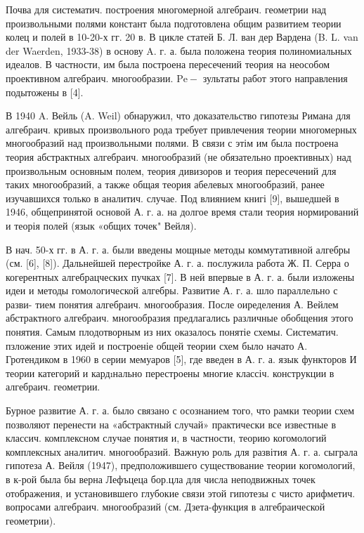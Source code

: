 \documentclass[10pt]{article}
\begin{document}
Почва для систематич. построения многомерной алгебраич. геометрии над произвольными полями констант была подготовлена общим развитием теории колец и полей в 10-20-х гг. 20 в. В цикле статей Б. Л. ван дер Вардена (B. L. van der Waerden, 1933-38) в основу A. г. а. была положена теория полиномиальных идеалов. В частности, им была построена пересечений теория на неособом проективном алгебраич. многообразии. $\mathrm{Pe}-$ зультаты работ этого направления подытожены в [4].



В 1940 A. Вейль (A. Weil) обнаружил, что доказательство гипотезы Римана для алгебраич. кривых произвольного рода требует привлечения теории многомерных многообразий над произвольными полями. В связи с этім им была построена теория абстрактных алгебраич. многообразий (не обязательно проективных) над произвольным основным полем, теория дивизоров и теория пересечений для таких многообразий, а также общая теория абелевых многообразий, ранее изучавшихся только в аналитич. случае. Под влиянием книгі [9], вышедшей в 1946, общепринятой основой А. г. а. на долгое время стали теория нормирований и теорія полей (язык «общих точек" Вейля).



В нач. 50-х гг. в А. г. а. были введены мощные методы коммутативной алгебры (см. [6], [8]). Дальнейшей перестройке А. г. а. послужила работа Ж. П. Серра о когерентных алгебрацческих пучках [7]. В ней впервые в А. г. а. были изложены идеи и методы гомологической алгебры. Развитие А. г. а. шло параллельно с разви- тием понятия алгебраич. многообразия. После оиределения А. Вейлем абстрактного алгебраич. многообразия предлагались различные обобщения этого понятия. Самым плодотворным из них оказалось понятіе схемы. Систематич. пзложение этих идей и построеніе общей теории схем было начато А. Гротендиком в 1960 в серии мемуаров [5], где введен в А. г. а. язык функторов И теории категорий и кардıнально перестроены многие классіч. конструкции в алгебраич. геометрии.



Бурное развитие А. г. а. было связано с осознанием того, что рамки теории схем позволяют перенести на «абстрактный случай» практически все известные в классич. комплексном случае понятия и, в частности, теорию когомологий комплексных аналитич. многообразий. Важную роль для развітия А. г. а. сыграла гипотеза А. Вейля (1947), предположившего существование теории когомологий, в к-рой была бы верна Лефъцеца бор.цла для числа неподвижных точек отображения, и установившего глубокие связи этой гипотезы с чисто арифметич. вопросами алгебраич. многообразий (см. Дзета-функция в алгебраической геометрии).
\end{document}

